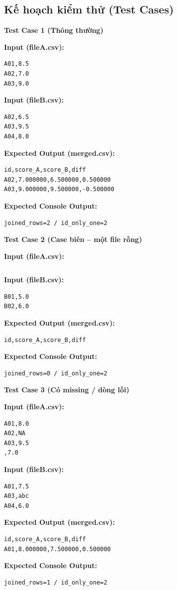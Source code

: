 \subsection{Kế hoạch kiểm thử (Test Cases)}

\textbf{Test Case 1 (Thông thường)}

\textbf{Input (fileA.csv):}
\begin{lstlisting}
A01,8.5
A02,7.0
A03,9.0
\end{lstlisting}

\textbf{Input (fileB.csv):}
\begin{lstlisting}
A02,6.5
A03,9.5
A04,8.0
\end{lstlisting}

\textbf{Expected Output (merged.csv):}
\begin{lstlisting}
id,score_A,score_B,diff
A02,7.000000,6.500000,0.500000
A03,9.000000,9.500000,-0.500000
\end{lstlisting}

\textbf{Expected Console Output:}
\begin{lstlisting}
joined_rows=2 / id_only_one=2
\end{lstlisting}

\vspace{0.5cm}

\textbf{Test Case 2 (Case biên -- một file rỗng)}

\textbf{Input (fileA.csv):}
\begin{lstlisting}
\end{lstlisting}

\textbf{Input (fileB.csv):}
\begin{lstlisting}
B01,5.0
B02,6.0
\end{lstlisting}

\textbf{Expected Output (merged.csv):}
\begin{lstlisting}
id,score_A,score_B,diff
\end{lstlisting}

\textbf{Expected Console Output:}
\begin{lstlisting}
joined_rows=0 / id_only_one=2
\end{lstlisting}

\vspace{0.5cm}

\textbf{Test Case 3 (Có missing / dòng lỗi)}

\textbf{Input (fileA.csv):}
\begin{lstlisting}
A01,8.0
A02,NA
A03,9.5
,7.0
\end{lstlisting}

\textbf{Input (fileB.csv):}
\begin{lstlisting}
A01,7.5
A03,abc
A04,6.0
\end{lstlisting}

\textbf{Expected Output (merged.csv):}
\begin{lstlisting}
id,score_A,score_B,diff
A01,8.000000,7.500000,0.500000
\end{lstlisting}

\textbf{Expected Console Output:}
\begin{lstlisting}
joined_rows=1 / id_only_one=2
\end{lstlisting}